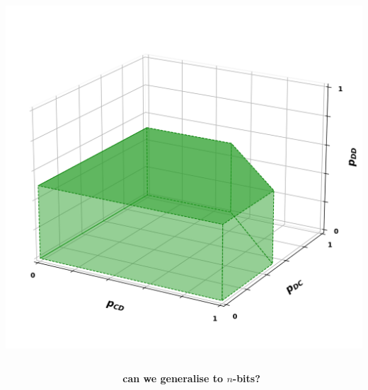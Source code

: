 \documentclass{beamer}
\begin{document}
\begin{frame}
    \centering
    \includegraphics[width=.75\textwidth]{static/two_bit_result.png}
\end{frame}

\begin{frame}
    \begin{center}
        \begin{columns}
            \centering
            \begin{column}{.5\textwidth}
            \centering
        
            \end{column}
        \begin{column}{.5\textwidth}
            \centering
            \textbf{can we generalise to $n$-bits?}
        \end{column}
    \end{columns}
    \end{center}
\end{frame}
\end{document}
